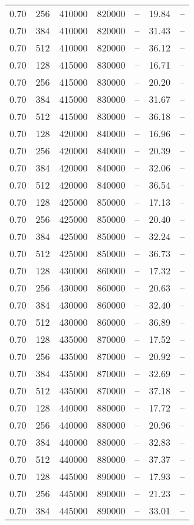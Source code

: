 \begin{tabular}{l|l|l|l|l|l|l}
0.70 & 256 & 410000 & 820000 & -- & 19.84 & --\\
0.70 & 384 & 410000 & 820000 & -- & 31.43 & --\\
0.70 & 512 & 410000 & 820000 & -- & 36.12 & --\\
0.70 & 128 & 415000 & 830000 & -- & 16.71 & --\\
0.70 & 256 & 415000 & 830000 & -- & 20.20 & --\\
0.70 & 384 & 415000 & 830000 & -- & 31.67 & --\\
0.70 & 512 & 415000 & 830000 & -- & 36.18 & --\\
0.70 & 128 & 420000 & 840000 & -- & 16.96 & --\\
0.70 & 256 & 420000 & 840000 & -- & 20.39 & --\\
0.70 & 384 & 420000 & 840000 & -- & 32.06 & --\\
0.70 & 512 & 420000 & 840000 & -- & 36.54 & --\\
0.70 & 128 & 425000 & 850000 & -- & 17.13 & --\\
0.70 & 256 & 425000 & 850000 & -- & 20.40 & --\\
0.70 & 384 & 425000 & 850000 & -- & 32.24 & --\\
0.70 & 512 & 425000 & 850000 & -- & 36.73 & --\\
0.70 & 128 & 430000 & 860000 & -- & 17.32 & --\\
0.70 & 256 & 430000 & 860000 & -- & 20.63 & --\\
0.70 & 384 & 430000 & 860000 & -- & 32.40 & --\\
0.70 & 512 & 430000 & 860000 & -- & 36.89 & --\\
0.70 & 128 & 435000 & 870000 & -- & 17.52 & --\\
0.70 & 256 & 435000 & 870000 & -- & 20.92 & --\\
0.70 & 384 & 435000 & 870000 & -- & 32.69 & --\\
0.70 & 512 & 435000 & 870000 & -- & 37.18 & --\\
0.70 & 128 & 440000 & 880000 & -- & 17.72 & --\\
0.70 & 256 & 440000 & 880000 & -- & 20.96 & --\\
0.70 & 384 & 440000 & 880000 & -- & 32.83 & --\\
0.70 & 512 & 440000 & 880000 & -- & 37.37 & --\\
0.70 & 128 & 445000 & 890000 & -- & 17.93 & --\\
0.70 & 256 & 445000 & 890000 & -- & 21.23 & --\\
0.70 & 384 & 445000 & 890000 & -- & 33.01 & --\\

\end{tabular}
